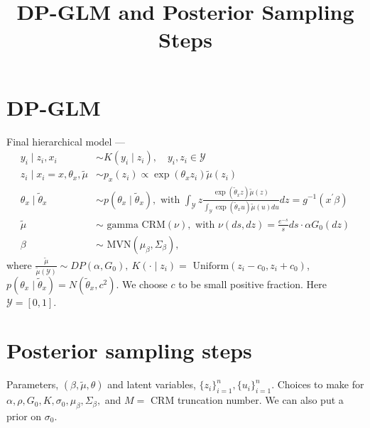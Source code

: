 \documentclass[10pt, oneside]{article}   	%
\title{DP-GLM and Posterior Sampling Steps}
\date{}							%
\renewcommand{\th}{\theta}
\newcommand{\sy}{\mathcal{Y}}
\renewcommand{\sy}{\mathcal{Y}}
\newcommand{\tmu}{\widetilde{\mu}}
\begin{document}
\maketitle

\section{DP-GLM}
Final hierarchical model ---
\begin{align*}
 y_i \mid  z_i, x_i & \sim K(y_i \mid z_i), \quad y_i, z_i \in \sy \\
z_i \mid x_i = x, \theta_{x}, \tmu & \sim p_x(z_i) \propto
                                       \exp(\th_{x} z_i) \widetilde
                                       \mu(z_i) \\ 
\theta_x \mid \widetilde \theta_x & \sim p(\theta_x \mid \widetilde \theta_x), \text{ with } \int_\sy z \frac{\exp(\widetilde \th_{x} z) \widetilde
                                       \mu(z)}{\int_\sy \exp(\widetilde \th_{x} u ) \widetilde
                                       \mu(u) du} dz = g^{-1}(x^\prime \beta)  \\ 
\tmu & \sim \text{ gamma CRM}(\nu), \text{ with } \nu(ds, dz) = \frac{e^{-s}}{s} ds \cdot \alpha G_0(dz) \\ 
\beta & \sim \text{ MVN}(\mu_\beta, \Sigma_\beta), 
\end{align*}
where $\frac{\widetilde \mu}{\tmu(\sy)}  \sim DP(\alpha, G_0), \ K(\cdot \mid z_i)  = \text{ Uniform}(z_i - c_0, z_i + c_0)$, $p(\theta_x \mid \widetilde \theta_x) = N(\widetilde \theta_x, c^2)$. We choose $c$ to be small positive fraction. Here $\sy = [0, 1]$.
\section{Posterior sampling steps}
Parameters, $(\beta, \widetilde \mu, \theta)$ and latent variables,  $\{z_i\}_{i=1}^n, \{u_i\}_{i=1}^n$. 
\newline Choices to make for $\alpha, \rho, G_0, K, \sigma_0, \mu_\beta, \Sigma_\beta,$ and $M = $ CRM truncation number. We can also put a prior on $\sigma_0$. \vspace{2mm}
\end{document}
